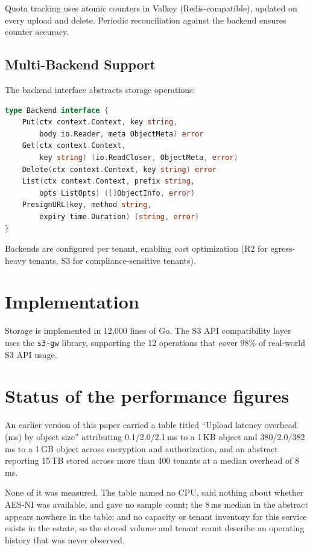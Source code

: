 \documentclass[11pt,twocolumn]{article}
\begin{document}
Quota tracking uses atomic counters in Valkey (Redis-compatible), updated on every upload and delete. Periodic reconciliation against the backend ensures counter accuracy.

\subsection{Multi-Backend Support}

The backend interface abstracts storage operations:

\begin{lstlisting}[language=Go]
type Backend interface {
    Put(ctx context.Context, key string,
        body io.Reader, meta ObjectMeta) error
    Get(ctx context.Context,
        key string) (io.ReadCloser, ObjectMeta, error)
    Delete(ctx context.Context, key string) error
    List(ctx context.Context, prefix string,
        opts ListOpts) ([]ObjectInfo, error)
    PresignURL(key, method string,
        expiry time.Duration) (string, error)
}
\end{lstlisting}

Backends are configured per tenant, enabling cost optimization (R2 for egress-heavy tenants, S3 for compliance-sensitive tenants).

\section{Implementation}

Storage is implemented in 12,000 lines of Go. The S3 API compatibility layer uses the \texttt{s3-gw} library, supporting the 12 operations that cover 98\% of real-world S3 API usage.

\section{Status of the performance figures}
\label{sec:figures}

An earlier version of this paper carried a table titled ``Upload latency
overhead (ms) by object size'' attributing 0.1/2.0/2.1\,ms to a 1\,KB object and
380/2.0/382\,ms to a 1\,GB object across encryption and authorization, and an
abstract reporting 15\,TB stored across more than 400 tenants at a median
overhead of 8\,ms.

None of it was measured. The table named no CPU, said nothing about whether
AES-NI was available, and gave no sample count; the 8\,ms median in the abstract
appears nowhere in the table; and no capacity or tenant inventory for this
service exists in the estate, so the stored volume and tenant count describe an
operating history that was never observed.
\end{document}
